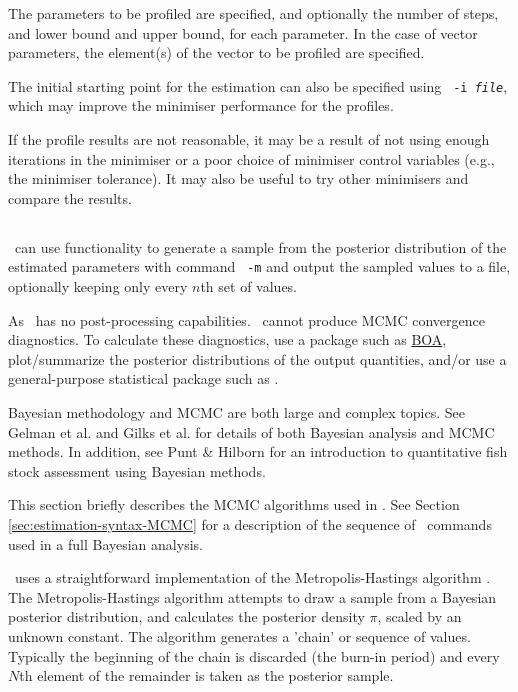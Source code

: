 The parameters to be profiled are specified, and optionally the number of steps, and lower bound and upper bound, for each parameter. In the case of vector parameters, the element(s) of the vector to be profiled are specified.

The initial starting point for the estimation can also be specified using \texttt{\cname\ -i \emph{file}}, which may improve the minimiser performance for the profiles.

If the profile results are not reasonable, it may be a result of not using enough iterations in the minimiser or a poor choice of minimiser control variables (e.g., the minimiser tolerance). It may also be useful to try other minimisers and compare the results.

\subsection{\label{sec:estimate-MCMC}}

\CNAME\ can use  functionality to generate a sample from the posterior distribution of the estimated parameters with command \texttt{\cname\ -m} and output the sampled values to a file, optionally keeping only every $n$th set of values.

As \CNAME\ has no post-processing capabilities. \CNAME\ cannot produce MCMC convergence diagnostics. To calculate these diagnostics, use a package such as \href{http://www.public-health.uiowa.edu/boa}{BOA}, plot/summarize the posterior distributions of the output quantities, and/or use a general-purpose statistical package such as \href{http://www.r-project.org}{\R}.

Bayesian methodology and MCMC are both large and complex topics. See Gelman et al. \citeyearpar{823} and Gilks et al. \citeyearpar{143} for details of both Bayesian analysis and MCMC methods. In addition, see Punt \& Hilborn \citeyearpar{828} for an introduction to quantitative fish stock assessment using Bayesian methods.

This section briefly describes the MCMC algorithms used in \CNAME. See Section \ref{sec:estimation-syntax-MCMC} for a description of the sequence of \CNAME\ commands used in a full Bayesian analysis.

\CNAME\ uses a straightforward implementation of the Metropolis-Hastings algorithm \citep{823,143}. The Metropolis-Hastings algorithm attempts to draw a sample from a Bayesian posterior distribution, and calculates the posterior density $\pi$, scaled by an unknown constant. The algorithm generates a 'chain' or sequence of values. Typically the beginning of the chain is discarded (the burn-in period) and every $N$th element of the remainder is taken as the posterior sample.

